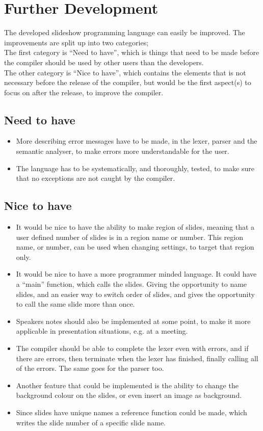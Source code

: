 \chapter{Further Development}
\label{sec:furtherdev}
The developed slideshow programming language can easily be improved. The improvements are split up into two categories; \\
The first category is ``Need to have'', which is things that need to be made before the compiler should be used by other users than the developers. \\
The other category is ``Nice to have'', which contains the elements that is not necessary before the release of the compiler, but would be the first aspect(s) to focus on after the release, to improve the compiler.

\section{Need to have}
\begin{itemize}
	\item More describing error messages have to be made, in the lexer, parser and the semantic analyser, to make errors more understandable for the user.
	\item The language has to be systematically, and thoroughly, tested, to make sure that no exceptions are not caught by the compiler.
\end{itemize}

\section{Nice to have}
\begin{itemize}
	\item It would be nice to have the ability to make region of slides, meaning that a user defined number of slides is in a region name or number. This region name, or number, can be used when changing settings, to target that region only.
	\item It would be nice to have a more programmer minded language. It could have a ``main'' function, which calls the slides. Giving the opportunity to name slides, and an easier way to switch order of slides, and gives the opportunity to call the same slide more than once.
	\item Speakers notes should also be implemented at some point, to make it more applicable in presentation situations, e.g. at a meeting.
	\item The compiler should be able to complete the lexer even with errors, and if there are errors, then terminate when the lexer has finished, finally calling all of the errors. The same goes for the parser too.
	\item Another feature that could be implemented is the ability to change the background colour on the slides, or even insert an image as background.
	\item Since slides have unique names a reference function could be made, which writes the slide number of a specific slide name.
\end{itemize}